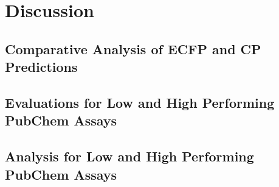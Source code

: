 \chapter{Discussion}\label{sec:discussion}


\section{Comparative Analysis of ECFP and CP Predictions}



\section{Evaluations for Low and High Performing PubChem Assays}



\section{Analysis for Low and High Performing PubChem Assays}